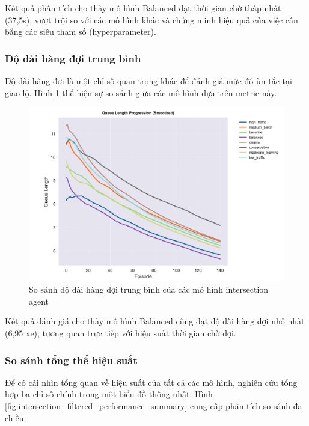 Kết quả phân tích cho thấy mô hình Balanced đạt thời gian chờ thấp nhất (37,5s), vượt trội so với các mô hình khác và chứng minh hiệu quả của việc cân bằng các siêu tham số (hyperparameter).

\subsubsection{Độ dài hàng đợi trung bình}
Độ dài hàng đợi là một chỉ số quan trọng khác để đánh giá mức độ ùn tắc tại giao lộ. Hình \ref{fig:intersection_filtered_queue_length} thể hiện sự so sánh giữa các mô hình dựa trên metric này.

\begin{figure}[!htp]
    \centering
    \includegraphics[width=\textwidth]{figures/individual_plots/intersection_filtered_queue_length.png}
    \caption{So sánh độ dài hàng đợi trung bình của các mô hình intersection agent}
    \label{fig:intersection_filtered_queue_length}
\end{figure}

Kết quả đánh giá cho thấy mô hình Balanced cũng đạt độ dài hàng đợi nhỏ nhất (6,95 xe), tương quan trực tiếp với hiệu suất thời gian chờ đợi.

\subsubsection{So sánh tổng thể hiệu suất}
Để có cái nhìn tổng quan về hiệu suất của tất cả các mô hình, nghiên cứu tổng hợp ba chỉ số chính trong một biểu đồ thống nhất. Hình \ref{fig:intersection_filtered_performance_summary} cung cấp phân tích so sánh đa chiều.

